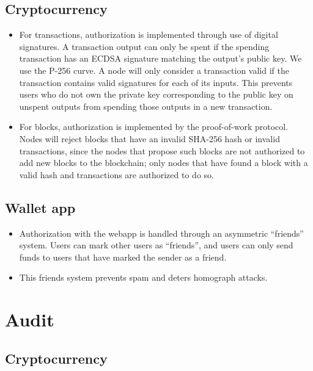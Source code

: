 \documentclass[a4paper,12pt]{article}
\begin{document}
\subsection{Cryptocurrency}
\begin{itemize}
	\item For transactions, authorization is implemented through use of digital signatures.
	A transaction output can only be spent if the spending transaction has an ECDSA signature matching the output's public key.
	We use the P-256 curve.
	A node will only consider a transaction valid if the transaction contains valid signatures for each of its inputs.
	This prevents users who do not own the private key corresponding to the public key on unspent outputs from spending those outputs in a new transaction.
	\item For blocks, authorization is implemented by the proof-of-work protocol.
	Nodes will reject blocks that have an invalid SHA-256 hash or invalid transactions, since the nodes that propose such blocks are not authorized to add new blocks to the blockchain; only nodes that have found a block with a valid hash and transactions are authorized to do so.
\end{itemize}

\subsection{Wallet app}

\begin{itemize}
	\item Authorization with the webapp is handled through an asymmetric ``friends'' system.
	Users can mark other users as ``friends'', and users can only send funds to users that have marked the sender as a friend.
	\item This friends system prevents spam and deters homograph attacks.
\end{itemize}

\section{Audit}

\subsection{Cryptocurrency}
\end{document}
